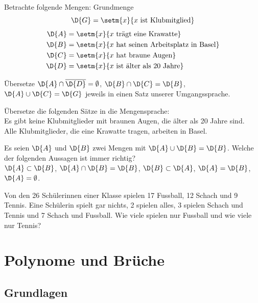 \documentclass[%
11pt,%
twoside,%
titlepage,%
german,%
]{scrartcl}
\begin{document}
\begin{ueb}
Betrachte folgende Mengen: Grundmenge
$$\D{G}=\setm{x}{x\text{ ist Klubmitglied}}$$
\begin{align*}
\D{A}&=\setm{x}{x\text{ tr\"agt eine Krawatte}}\\
\D{B}&=\setm{x}{x\text{ hat seinen Arbeitsplatz in Basel}}\\
\D{C}&=\setm{x}{x\text{ hat braune Augen}}\\
\D{D}&=\setm{x}{x\text{ ist \"alter als 20 Jahre}}
\end{align*}
\begin{enumeratea}
\item Übersetze $\D{A}\cap\overline{\D{D}}=\emptyset$, $\D{B}\cap\D{C}=\D{B}$, $\D{A}\cup\D{C}=\D{G}$ jeweils in einen Satz unserer Umgangssprache.
\item Übersetze die folgenden S\"atze in die Mengensprache:\\
Es gibt keine Klubmitglieder mit braunen Augen, die \"alter als 20 Jahre sind.\\
Alle Klubmitglieder, die eine Krawatte tragen, arbeiten in Basel.
\end{enumeratea}
\end{ueb}

\begin{ueb}
Es seien $\D{A}$ und $\D{B}$ zwei Mengen mit $\D{A}\cup\D{B}=\D{B}$. Welche der folgenden Aussagen ist immer richtig?\\
$\D{A}\subset\D{B}$, $\D{A}\cap\D{B}=\D{B}$, $\D{B}\subset\D{A}$, $\D{A}=\D{B}$, $\D{A}=\emptyset$.
\end{ueb}

\begin{ueb}[Planung]
Von den 26 Sch\"ulerinnen einer Klasse spielen 17 Fussball, 12 Schach und 9 Tennis. Eine Sch\"ulerin spielt gar nichts, 2 spielen alles, 3 spielen Schach und Tennis und 7 Schach und Fussball. Wie viele spielen nur Fussball und wie viele nur Tennis?
\end{ueb}

\cleardoublepage

\section{Polynome und Brüche}

\subsection{Grundlagen}
\end{document}
